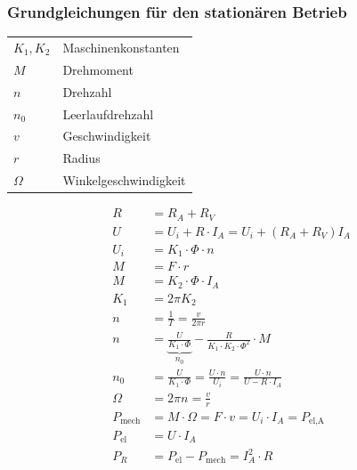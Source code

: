\documentclass[a4paper,twocolumn,10pt]{article}
\begin{document}
\subsubsection{Grundgleichungen für den stationären Betrieb}
\begin{tabular}{ll}
$K_1,K_2$ & Maschinenkonstanten\\
$M$ & Drehmoment\\
$n$ & Drehzahl\\
$n_0$ & Leerlaufdrehzahl\\
$v$ & Geschwindigkeit\\
$r$ & Radius\\
$\Omega$ & Winkelgeschwindigkeit
\end{tabular}
\begin{equation*}
\begin{split}
R&=R_A+R_V\\
U&=U_i+R\cdot I_A=U_i+(R_A+R_V)I_A\\
U_i&=K_1\cdot\Phi\cdot n\\
M&=F\cdot r\\
M&=K_2\cdot\Phi\cdot I_A\\
K_1&=2\pi K_2\\
n&=\frac{1}{T}=\frac{v}{2\pi r}\\
n&=\underbrace{\frac{U}{K_1\cdot \Phi}}_{n_0}-\frac{R}{K_1\cdot K_2\cdot\Phi^2}\cdot M\\
n_0&=\frac{U}{K_1\cdot\Phi}=\frac{U\cdot n}{U_i}=\frac{U\cdot n}{U-R\cdot I_A}\\
\Omega&=2\pi n=\frac{v}{r}\\
P_{\text{mech}}&=M\cdot\Omega=F\cdot v=U_i\cdot I_A=P_{\text{el,A}}\\
P_{\text{el}}&=U\cdot I_A\\
P_R&=P_{\text{el}}-P_{\text{mech}}=I_A^2\cdot R
\end{split}
\end{equation*}
\end{document}
